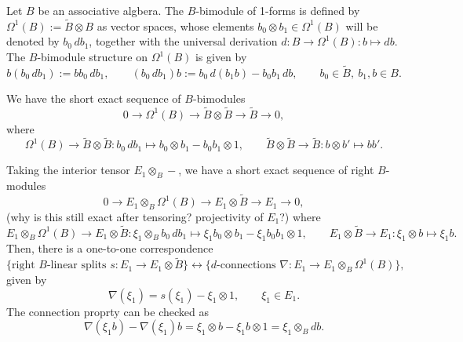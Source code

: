 \documentclass{../../large}
\begin{document}
\begin{prb}
Let $B$ be an associative algbera.
The $B$-bimodule of 1-forms is defined by $\Omega^1(B):=\tilde B\otimes B$ as vector spaces, whose elements $b_0\otimes b_1\in\Omega^1(B)$ will be denoted by $b_0\,db_1$, together with the universal derivation $d:B\to\Omega^1(B):b\mapsto db$.
The $B$-bimodule structure on $\Omega^1(B)$ is given by
\[b(b_0\,db_1):=bb_0\,db_1,\qquad(b_0\,db_1)b:=b_0\,d(b_1b)-b_0b_1\,db,\qquad b_0\in\tilde B,\ b_1,b\in B.\]

We have the short exact sequence of $B$-bimodules
\[0\to\Omega^1(B)\to\tilde B\otimes\tilde B\to\tilde B\to0,\]
where
\[\Omega^1(B)\to\tilde B\otimes\tilde B:b_0\,db_1\mapsto b_0\otimes b_1-b_0b_1\otimes1,\qquad\tilde B\otimes\tilde B\to\tilde B:b\otimes b'\mapsto bb'.\]
\end{prb}




\begin{prb}
Taking the interior tensor $E_1\otimes_B-$, we have a short exact sequence of right $B$-modules
\[0\to E_1\otimes_B\Omega^1(B)\to E_1\otimes\tilde B\to E_1\to0,\]
(why is this still exact after tensoring? projectivity of $E_1$?)
where
\[E_1\otimes_B\Omega^1(B)\to E_1\otimes\tilde B:\xi_1\otimes_Bb_0\,db_1\mapsto\xi_1b_0\otimes b_1-\xi_1b_0b_1\otimes1,\qquad E_1\otimes\tilde B\to E_1:\xi_1\otimes b\mapsto \xi_1b.\]
Then, there is a one-to-one correspondence
\[\{\text{right $B$-linear splits $s:E_1\to E_1\otimes\tilde B$}\}\leftrightarrow
\{\text{$d$-connections $\nabla:E_1\to E_1\otimes_B\Omega^1(B)$}\},\]
given by
\[\nabla(\xi_1)=s(\xi_1)-\xi_1\otimes1,\qquad\xi_1\in E_1.\]
The connection proprty can be checked as
\[\nabla(\xi_1b)-\nabla(\xi_1)b=\xi_1\otimes b-\xi_1b\otimes1=\xi_1\otimes_Bdb.\]

\end{prb}
\end{document}

